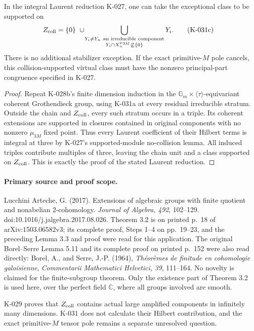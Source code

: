 \begin{corollary}
In the integral Laurent reduction K-027, one can take the
exceptional class to be supported on
\[
 Z_{\rm coll}=\{0\}\ \cup\!
 \bigcup_{\substack{Y_i\ne Y_n\ \text{an irreducible component}\\
                  Y_i\cap X_n^{\mu_{3M}}\not\subseteq\{0\}}}Y_i.
                                                        \tag{K-031c}
\]
There is no additional stabilizer exception.  If the exact
primitive-$M$ pole cancels, this collision-supported virtual
class must have the nonzero principal-part congruence specified
in K-027.
\end{corollary}

\begin{proof}
Repeat K-028b's finite dimension induction in the
$\mathbb G_m\times\langle\tau\rangle$-equivariant coherent
Grothendieck group, using K-031a at every residual irreducible
stratum.  Outside the chain and $Z_{\rm coll}$, every such
stratum occurs in a triple.  Its coherent extensions are
supported in closures contained in original components with
no nonzero $\mu_{3M}$ fixed point.  Thus every Laurent
coefficient of their Hilbert terms is integral at three by
K-027's supported-module no-collision lemma.  All induced
triples contribute multiples of three, leaving the chain
unit and a class supported on $Z_{\rm coll}$.  This is exactly
the proof of the stated Laurent reduction.
\end{proof}

\paragraph{Primary source and proof scope.}
Lucchini Arteche, G. (2017). Extensions of algebraic groups with
finite quotient and nonabelian 2-cohomology. \emph{Journal of
Algebra, 492}, 102--129. doi:10.1016/j.jalgebra.2017.08.026.
Theorem 3.2 is on printed p.~18 of arXiv:1503.06582v3; its
complete proof, Steps 1--4 on pp.~19--23, and the preceding
Lemma 3.3 and proof were read for this application.  The original
Borel--Serre Lemma 5.11 and its complete proof on printed p.~152
were also read directly: Borel, A., and Serre, J.-P. (1964),
\emph{Th\'eor\`emes de finitude en cohomologie galoisienne},
\emph{Commentarii Mathematici Helvetici, 39}, 111--164.
No novelty is claimed for the finite-subgroup theorem.  Only the existence
part of Theorem 3.2 is used here, over the perfect field
$\mathbb C$, where all groups involved are smooth.

K-029 proves that $Z_{\rm coll}$ contains actual large amplified
components in infinitely many dimensions.  K-031 does not
calculate their Hilbert contribution, and the exact primitive-$M$
tensor pole remains a separate unresolved question.
